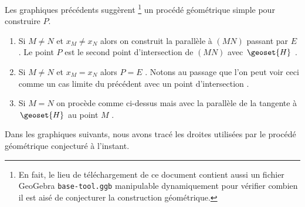 \begin{multicols}{2}
	\bigskip

\end{multicols}


\bigskip
	

Les graphiques précédents suggèrent
\footnote{
	En fait, le lieu de téléchargement de ce document contient aussi un fichier GeoGebra \texttt{base-tool.ggb} manipulable dynamiquement pour vérifier combien il est aisé de conjecturer la construction géométrique.
}
un procédé géométrique simple pour construire $P$.

\begin{enumerate}
	\item Si $M \neq N$ et $x_M \neq x_N$ alors on construit la parallèle à $(MN)$ passant par $E$ . Le point $P$ est le second point d'intersection de $(MN)$ avec $\geoset{H}$ .


	\item Si $M \neq N$ et $x_M = x_N$ alors $P = E$ . Notons au passage que l'on peut voir ceci comme un cas limite du précédent avec un point d'intersection .


	\item Si $M = N$ on procède comme ci-dessus mais avec la parallèle de la tangente à $\geoset{H}$ au point $M$ .
\end{enumerate}


Dans les graphiques suivants, nous avons tracé les droites utilisées par le procédé géométrique conjecturé à l'instant.


\medskip


